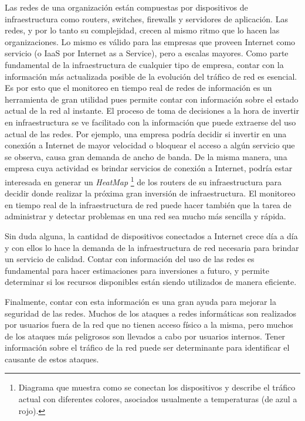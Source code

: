 Las redes de una organización están compuestas por dispositivos de infraestructura como routers, switches, firewalls y servidores de aplicación. Las redes, y por lo tanto su complejidad, crecen al mismo ritmo que lo hacen las organizaciones.
Lo mismo es válido para las empresas que proveen Internet como servicio (o IaaS por Internet as a Service), pero a escalas mayores. Como parte fundamental de la infraestructura de cualquier tipo de empresa, contar con la información más actualizada posible de la evolución del tráfico de red es esencial. Es por esto que el monitoreo en tiempo real de redes de información es un herramienta de gran utilidad pues permite contar con información sobre el estado actual de la red al instante. El proceso de toma de decisiones a la hora de invertir en infraestructura se ve facilitado con la información que puede extraerse del uso actual de las redes. Por ejemplo, una empresa podría decidir si invertir en una conexión a Internet de mayor velocidad o bloquear el acceso a algún servicio que se observa, causa gran demanda de ancho de banda. De la misma manera, una empresa cuya actividad es brindar servicios de conexión a Internet, podría estar interesada en generar un \textit{HeatMap} \footnote{Diagrama que muestra como se conectan los dispositivos y describe el tráfico actual con diferentes colores, asociados usualmente a temperaturas (de azul a rojo).} de los routers de su infraestructura para decidir donde realizar la próxima gran inversión de infraestructura. El monitoreo en tiempo real de la infraestructura de red puede hacer también que la tarea de administrar y detectar problemas en una red sea mucho más sencilla y rápida.

Sin duda alguna, la cantidad de dispositivos conectados a Internet crece día a día y con ellos lo hace la demanda de la infraestructura de red necesaria para brindar un servicio de calidad. Contar con información del uso de las redes es fundamental para hacer estimaciones para inversiones a futuro, y permite determinar si los recursos disponibles están siendo utilizados de manera eficiente.

Finalmente, contar con esta información es una gran ayuda para mejorar la seguridad de las redes. Muchos de los ataques a redes informáticas son realizados por usuarios fuera de la red que no tienen acceso físico a la misma, pero muchos de los ataques más peligrosos son llevados a cabo por usuarios internos. Tener información sobre el tráfico de la red puede ser determinante para identificar el causante de estos ataques.

